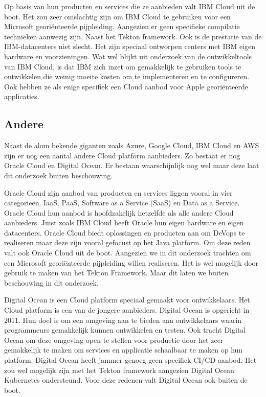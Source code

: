 Op basis van hun producten en services die ze aanbieden valt IBM Cloud uit de boot. Het zou zeer omslachtig zijn om IBM Cloud te gebruiken voor een Microsoft georiënteerde pijpleiding. Aangezien er geen specifieke compilatie technieken aanwezig zijn. Naast het Tekton framework. Ook is de prestatie van de IBM-datacenters niet slecht. Het zijn speciaal ontworpen centers met IBM eigen hardware en voorzieningen. Wat wel blijkt uit onderzoek van de ontwikkeltools van IBM Cloud, is dat IBM zich inzet om gemakkelijk te gebruiken tools te ontwikkelen die weinig moeite kosten om te implementeren en te configureren. Ook hebben ze als enige specifiek een Cloud aanbod voor Apple georiënteerde applicaties.

\subsection{Andere}
Naast de alom bekende giganten zoals Azure, Google Cloud, IBM Cloud en AWS zijn er nog een aantal andere Cloud platform aanbieders. Zo bestaat er nog Oracle Cloud en Digital Ocean. Er bestaan waarschijnlijk nog wel maar deze laat dit onderzoek buiten beschouwing.

Oracle Cloud zijn aanbod van producten en services liggen vooral in vier categorieën. IaaS, PaaS, Software as a Service (SaaS) en Data as a Service. Oracle Cloud hun aanbod is hoofdzakelijk hetzelfde als alle andere Cloud aanbieders. Juist zoals IBM Cloud heeft Oracle hun eigen hardware en eigen datacenters. Oracle Cloud biedt oplossingen en producten aan om DeVops te realiseren maar deze zijn vooral gefocust op het Java platform. Om deze reden valt ook Oracle Cloud uit de boot. Aangezien we in dit onderzoek trachten om een Microsoft georiënteerde pijpleiding willen realiseren. Het is wel mogelijk door gebruik te maken van het Tekton Framework. Maar dit laten we buiten beschouwing in dit onderzoek.

Digital Ocean is een Cloud platform speciaal gemaakt voor ontwikkelaars. Het Cloud platform is een van de jongere aanbieders. Digital Ocean is opgericht in 2011. Hun doel is om een omgeving aan te bieden aan ontwikkelaars waarin programmeurs gemakkelijk kunnen ontwikkelen en testen. Ook tracht Digital Ocean om deze omgeving open te stellen voor productie door het zeer gemakkelijk te maken om services en applicatie schaalbaar te maken op hun platform. Digital Ocean heeft jammer genoeg geen specifiek CI/CD aanbod. Het zou wel mogelijk zijn met het Tekton framework aangezien Digital Ocean Kubernetes ondersteund. Voor deze redenen valt Digital Ocean ook buiten de boot.

